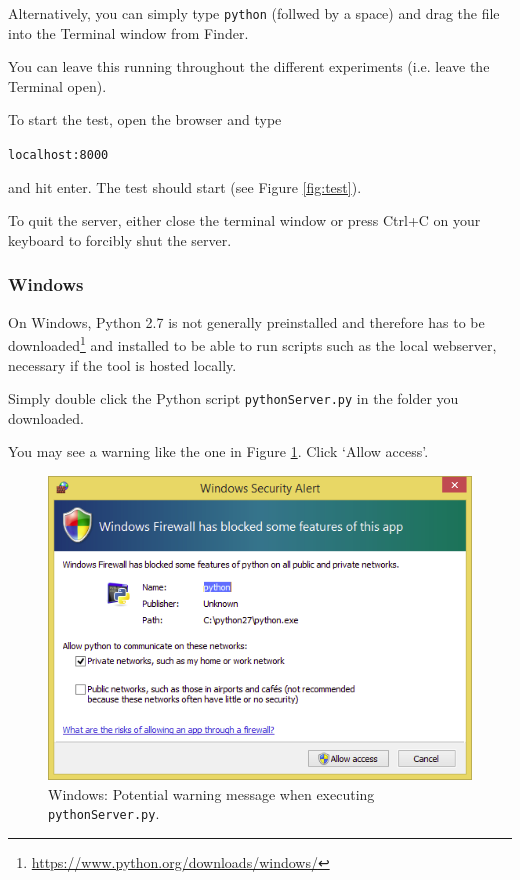 \documentclass[11pt, oneside]{article}   	%
\begin{document}
	        Alternatively, you can simply type \texttt{python} (follwed by a space) and drag the file into the Terminal window from Finder. %
			
			You can leave this running throughout the different experiments (i.e. leave the Terminal open). 

			To start the test, open the browser and type 
				
			\texttt{localhost:8000}

			and hit enter. The test should start (see Figure \ref{fig:test}). 

			To quit the server, either close the terminal window or press Ctrl+C on your keyboard to forcibly shut the server.

		\subsubsection{Windows}

			On Windows, Python 2.7 is not generally preinstalled and therefore has to be downloaded\footnote{\url{https://www.python.org/downloads/windows/}} and installed to be able to run scripts such as the local webserver, necessary if the tool is hosted locally. 
		
			Simply double click the Python script \texttt{pythonServer.py} in the folder you downloaded. 
			
			You may see a warning like the one in Figure \ref{fig:warning}. Click `Allow access'. 
			
			\begin{figure}[htbp]
            \begin{center}
            \includegraphics[width=.6\textwidth]{warning.png}
            \caption{Windows: Potential warning message when executing \texttt{pythonServer.py}.}
            \label{fig:warning}
            \end{center}
            \end{figure}
            
\end{document}
